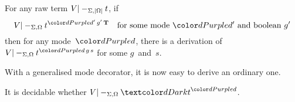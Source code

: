 \begin{lemma}\label{thm:adjustment}
For any raw term $V |-_{\Sigma,\left|\Omega\right|} t$, if
\begin{equation}\label{eq:strict-derivation}
V |-_{\Sigma,\Omega} t^{\dir{d'}\,g'\,\BTrue} \quad\text{for some mode~$\dir{d'}$ and boolean~$g'$}
\end{equation}
then for any mode~$\dir{d}$, there is a derivation of $V |-_{\Sigma,\Omega} t^{\dir{d}\,g\,s}$ for some $g$~and~$s$.
\end{lemma}


%

With a generalised mode decorator, it is now easy to derive an ordinary one.

\begin{corollary}\label{thm:mode-decoration}
  It is decidable whether $V |-_{\Sigma,\Omega} \isTerm{t}^\dir{d}$.%
\end{corollary}


